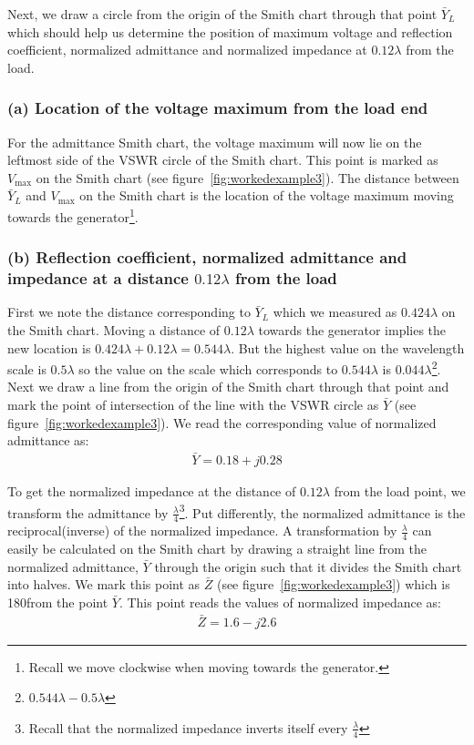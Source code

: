 \begin{exmp}
Next, we draw a circle from the origin of the Smith chart through that point $\bar{Y}_L$ which should help us determine the position of maximum voltage and reflection coefficient, normalized admittance and normalized impedance at $0.12\lambda$ from the load.

\subsubsection*{(a) Location of the voltage maximum from the load end}
For the admittance Smith chart, the voltage maximum will now lie on the leftmost side of the VSWR circle of the Smith chart. This point is marked as $V_\max$ on the Smith chart (see figure~\ref{fig:workedexample3}). The distance between $\bar{Y}_L$ and $V_\max$ on the Smith chart is the location of the voltage maximum moving towards the generator\footnote{
Recall we move clockwise when moving towards the generator.
}.

\subsubsection*{(b) Reflection coefficient, normalized admittance and impedance at a distance $0.12\lambda$ from the load}
First we note the distance corresponding to $\bar{Y}_L$ which we measured as $0.424\lambda$ on the Smith chart. Moving a distance of $0.12\lambda$ towards the generator implies the new location is $0.424\lambda + 0.12\lambda = 0.544\lambda$. But the highest value on the wavelength scale is $0.5\lambda$ so the value on the scale which corresponds to $0.544\lambda$ is $0.044\lambda$\footnote{
$0.544\lambda-0.5\lambda$
}. Next we draw a line from the origin of the Smith chart through that point and mark the point of intersection of the line with the VSWR circle as $\bar{Y}$ (see figure~\ref{fig:workedexample3}). We read the corresponding value of normalized admittance as:
\begin{align*}
\bar{Y} = 0.18 + j0.28
\end{align*}

To get the normalized impedance at the distance of $0.12\lambda$ from the load point, we transform the admittance by $\frac{\lambda}{4}$\footnote{
Recall that the normalized impedance inverts itself every $\frac{\lambda}{4}$
}. Put differently, the normalized admittance is the reciprocal(inverse) of the normalized impedance. A transformation by $\frac{\lambda}{4}$ can easily be calculated on the Smith chart by drawing a straight line from the normalized admittance, $\bar{Y}$ through the origin such that it divides the Smith chart into halves. We mark this point as $\bar{Z}$ (see figure~\ref{fig:workedexample3}) which is 180\textdegree from the point $\bar{Y}$. This point reads the values of normalized impedance as:
\begin{align*}
\bar{Z} = 1.6 - j2.6
\end{align*}


\end{exmp}
